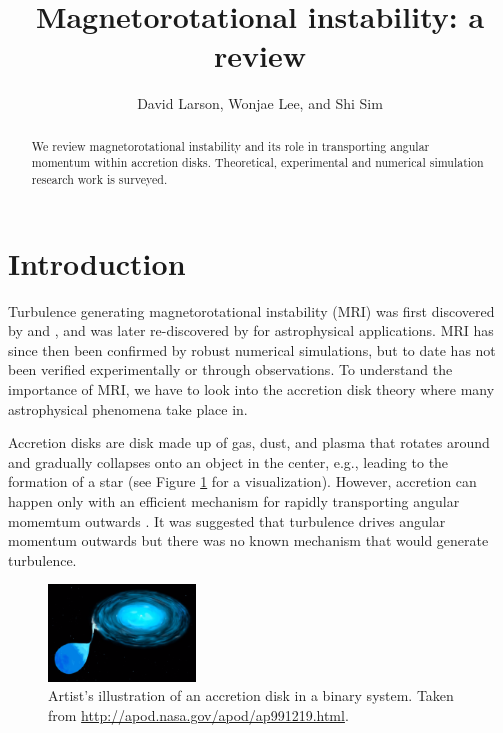 \documentclass{jfm}
\title[Magnetorotational instability]{Magnetorotational instability: a review}
\author[D. Larson, W. Lee, and S. Sim]{David Larson, Wonjae Lee, and Shi Sim}
\affiliation{University of California, San Diego}
\begin{document}
\maketitle


\begin{abstract}
We review magnetorotational instability and its role in transporting angular 
momentum within accretion disks. Theoretical, experimental and numerical simulation
research work is surveyed.
\end{abstract}


\tableofcontents


\section{Introduction}
\label{sec:intro}

Turbulence generating magnetorotational instability (MRI) was first discovered
by \cite{Velikhov1959} and \cite{Chandrasekhar1960}, and was later
re-discovered by \cite{Balbus1998} for astrophysical applications. MRI has
since then been confirmed by robust numerical simulations, but to date has not
been verified experimentally or through observations. To understand the
importance of MRI, we have to look into the accretion disk theory where many
astrophysical phenomena take place in.

Accretion disks are disk made up of gas, dust, and plasma that rotates around
and gradually collapses onto an object in the center, e.g., leading to the
formation of a star (see Figure \ref{fig:accretion_disk} for a visualization).
However, accretion can happen only with an efficient mechanism for rapidly
transporting angular momemtum outwards \citep{Julien2010}. It was suggested
that turbulence drives angular momentum outwards but there was no known
mechanism that would generate turbulence. 


\begin{figure}[t]
    \centering
    \includegraphics[width=0.35\textwidth]{accretion_disk}
        \caption{Artist's illustration of an accretion disk in a binary system. Taken from \url{http://apod.nasa.gov/apod/ap991219.html}.}
        \label{fig:accretion_disk}
\end{figure}
\end{document}
